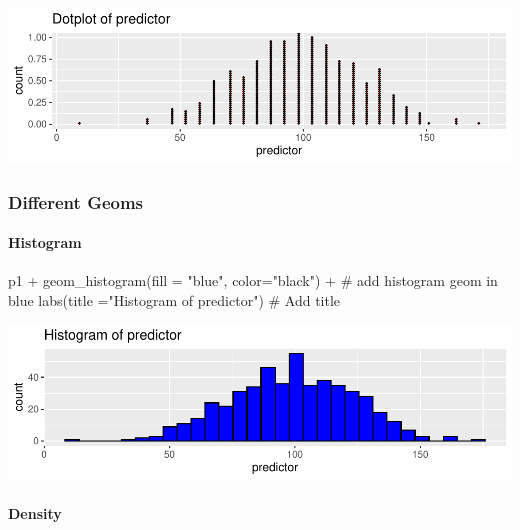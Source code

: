 \documentclass[12pt,]{article}
\newenvironment{Shaded}{}{}
\newcommand{\CommentTok}[1]{\textcolor[rgb]{0.00,0.50,0.00}{#1}}
\newcommand{\DataTypeTok}[1]{#1}
\newcommand{\KeywordTok}[1]{\textcolor[rgb]{0.00,0.00,1.00}{#1}}
\newcommand{\NormalTok}[1]{#1}
\newcommand{\OperatorTok}[1]{#1}
\newcommand{\StringTok}[1]{\textcolor[rgb]{0.00,0.50,0.50}{#1}}
\let\oldparagraph\paragraph
\renewcommand{\paragraph}[1]{\oldparagraph{#1}\mbox{}}
\begin{document}
\includegraphics{introduction-to-ggplot2_files/figure-latex/unnamed-chunk-8-1.pdf}

\hypertarget{different-geoms}{%
\subsubsection{Different Geoms}\label{different-geoms}}

\hypertarget{histogram}{%
\paragraph{Histogram}\label{histogram}}

\begin{Shaded}
\begin{Highlighting}[]
\NormalTok{p1 }\OperatorTok{+}\StringTok{ }\KeywordTok{geom_histogram}\NormalTok{(}\DataTypeTok{fill =} \StringTok{"blue"}\NormalTok{, }
                    \DataTypeTok{color=}\StringTok{"black"}\NormalTok{) }\OperatorTok{+}\StringTok{ }\CommentTok{# add histogram geom in blue}
\StringTok{  }\KeywordTok{labs}\NormalTok{(}\DataTypeTok{title =}\StringTok{"Histogram of predictor"}\NormalTok{) }\CommentTok{# Add title}
\end{Highlighting}
\end{Shaded}

\includegraphics{introduction-to-ggplot2_files/figure-latex/unnamed-chunk-9-1.pdf}

\hypertarget{density}{%
\paragraph{Density}\label{density}}
\end{document}
